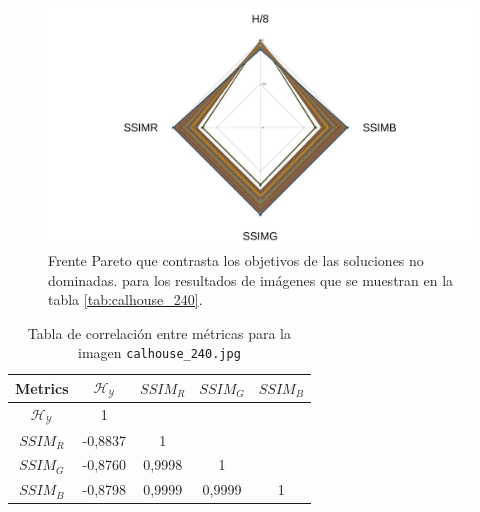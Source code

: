     \begin{figure}[H]
    \centering
    \includegraphics[width=\textwidth]{./Figures/calhouse_240/calhouse_240_2.jpg}
    \caption{Frente Pareto que contrasta los objetivos de las soluciones no dominadas. para los resultados de imágenes que se muestran en la tabla \ref{tab:calhouse_240}.}
    \label{fig:calhouse2402fp}
    \end{figure}

\begin{table}[H]
\setlength{\abovecaptionskip}{2pt plus 3pt minus 2pt} %
\caption[Parámetros de entrada para $MOPSO$]{Tabla de correlación entre métricas para la imagen \texttt{calhouse\_240.jpg}}
\begin{center}
 \begin{tabular}{||c | c c c c||} 
 \hline
Metrics & $\mathscr{H_Y}$ & $SSIM_R$ & $SSIM_G$ & $SSIM_B$ \\ 
\hline
$\mathscr{H_Y}$ & 1 &  &  & \\ 
\hline
$SSIM_R$ & -0,8837 & 1 &  \\ 
\hline
$SSIM_G$ & -0,8760 & 0,9998  & 1  & \\ 
\hline
$SSIM_B$ & -0,8798 & 0,9999  & 0,9999  & 1 \\ 
\hline
\end{tabular}
\end{center}
\label{table:correlacion}
\end{table}


